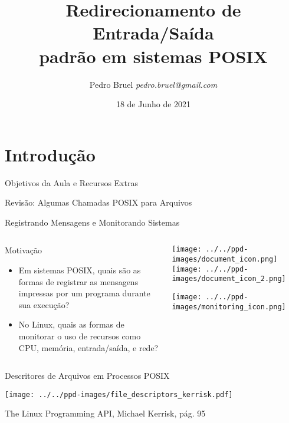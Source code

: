 \documentclass[10pt, compress, aspectratio=169, xcolor={table,usenames,dvipsnames}]{beamer}
\author{\footnotesize Pedro Bruel \newline \scriptsize \emph{pedro.bruel@gmail.com}}
\date{\scriptsize 18 de Junho de 2021}
\title{ Redirecionamento de Entrada/Saída \\
padrão em sistemas POSIX}
\begin{document}
\maketitle

\section{Introdução}
\label{sec:org8330c1e}
\begin{frame}[label={sec:org9041c78}]{Objetivos da Aula e Recursos Extras}
\end{frame}
\begin{frame}[label={sec:orgb3d202a}]{Revisão: Algumas Chamadas POSIX para Arquivos}
\end{frame}
\begin{frame}[label={sec:org179061a}]{Registrando Mensagens e Monitorando Sistemas}
\begin{columns}
\begin{column}{0.6\columnwidth}
\begin{block}{Motivação}
\begin{itemize}
\item Em sistemas POSIX,  quais são as formas de \alert{registrar  as mensagens impressas}
por um programa durante sua execução?
\item No Linux, quais as formas de \alert{monitorar  o uso de recursos} como CPU, memória,
entrada/saída, e rede?
\end{itemize}
\end{block}
\end{column}
\begin{column}{0.4\columnwidth}
\begin{center}
  \texttt{[image: ../../ppd-images/document\_icon.png]}
  \texttt{[image: ../../ppd-images/document\_icon\_2.png]}

  \vspace{1em}

  \texttt{[image: ../../ppd-images/monitoring\_icon.png]}
\end{center}
\end{column}
\end{columns}
\end{frame}
\begin{frame}[label={sec:orgab23e77}]{Descritores de Arquivos em Processos POSIX}
\begin{center}
\texttt{[image: ../../ppd-images/file\_descriptors\_kerrisk.pdf]}
\end{center}

\begin{center}
\scriptsize
The Linux Programming API, Michael Kerrisk, pág. 95
\end{center}
\end{frame}
\end{document}
